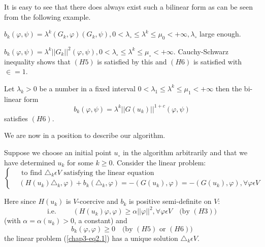 It is easy to see that there does always exist such a bilinear form as can be seen from the following example.

\begin{example}\label{chap3-exam2.1}
$b_{k}(\varphi, \psi) = \lambda^{k} (G_{k}, \varphi) (G_{k}, \psi), 0 < \lambda_{\circ} \leq \lambda^{k} \leq \mu_{0} < + \infty, \lambda_{\circ}$ large enough.
\end{example}

\begin{example}\label{chap3-exam2.2}
$b_{k} (\varphi, \psi) = \lambda^{k} ||G_{k}||^{2} (\varphi, \psi), 0 < \lambda_{\circ} \leq \lambda^{k} \leq \mu_{\circ} < + \infty$. Cauchy-Schwarz inequality shows that $(H5)$ is satisfied by this and $(H6)$ is satisfied with $\in = 1$.
\end{example}

\begin{example}\label{chap3-exam2.3}
Let $\lambda_{k} > 0$ be a number in a fixed interval $0 < \lambda_{1} \leq \lambda^{k} \leq \mu_{1} < + \infty$ then the bi-linear form
$$
b_{k} (\varphi, \psi) = \lambda^{k} ||G(u_{k})||^{1+c} (\varphi, \psi)
$$
satisfies $(H6)$.
\end{example}

We are now in a position to describe our algorithm.

\medskip
{} Suppose we choose an initial point $u_{\circ}$ in the algorithm arbitrarily and that we have determined $u_{k}$ for some $k \geq 0$. Consider the linear problem:
\begin{equation*}
\begin{cases}
& \text{ to find } \triangle_{k} \epsilon V \text{ satisfying the linear equation }\\
& (H(u_{k})\triangle_{k}, \varphi) + b_{k}(\triangle_{k}, \varphi) = -(G(u_{k}), \varphi) = - (G(u_{k}), \varphi), \forall \varphi \epsilon V
\end{cases}\tag{2.1}\label{chap3-eq2.1}
\end{equation*}

Here since $H(u_{k})$ is $V$-coercive and $b_{k}$ is positive semi-definite on $V$:
\begin{equation*}
\text{i.e. }\qquad (H(u_{k})\varphi, \varphi) \geq \alpha ||\varphi||^{2}, \forall \varphi \epsilon V \quad \text{(by $(H3)$)}
\end{equation*}\pageoriginale
(with $\alpha = \alpha (u_{k}) > 0$, a constant) and
\begin{equation*}
b_{k} (\varphi, \varphi) \geq 0 \quad \text{(by $(H5)$ or $(H6)$)}
\end{equation*}
the linear problem (\ref{chap3-eq2.1}) has a unique solution $\triangle_{k} \epsilon V$.

